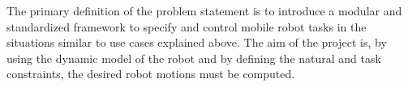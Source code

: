 The primary definition of the problem statement is to introduce a modular and standardized framework to specify and control mobile robot tasks in the situations similar to use cases explained above. The aim of the project is, by using the dynamic model of the robot and by defining the natural and task constraints, the desired robot motions must be computed. 


%
%
%
